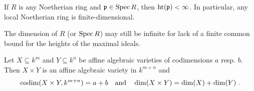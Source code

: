 \documentclass[a4paper,parskip=half,numbers=enddot, DIV=12]{scrreprt}
\begin{document}
\begin{cor}
    If $R$ is any Noetherian ring and $\mathfrak{p}\in\operatorname{Spec} R$, then $\operatorname{ht}(\mathfrak{p}) < \infty$. In particular, any local Noetherian ring is finite-dimensional.
\end{cor}
\begin{rem*}
    The dimension of $R$ (or $\operatorname{Spec} R$) may still be infinite for lack of a finite common bound for the heights of the maximal ideals.
\end{rem*}
\begin{prop}
    Let $X\subseteq k^m$ and $Y\subseteq k^n$ be affine algebraic varieties of codimensions $a$ resp. $b$. Then $X\times Y$ is an affine algebraic variety in $k^{m+n}$ and
    \begin{align*}
    	\operatorname{codim}(X\times Y, k^{m+n})=a+b\quad\text{and}\quad\dim(X\times Y)=\dim (X)+\dim (Y)\;.
    \end{align*}
\end{prop}
\end{document}
